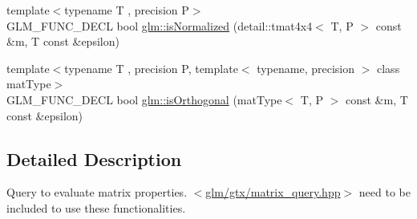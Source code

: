 \begin{DoxyCompactItemize}
\item 
{\footnotesize template$<$typename T , precision P$>$ }\\G\-L\-M\-\_\-\-F\-U\-N\-C\-\_\-\-D\-E\-C\-L bool \hyperlink{group__gtx__matrix__query_gad0ff11cc2c26d3086d9f88316a321637}{glm\-::is\-Normalized} (detail\-::tmat4x4$<$ T, P $>$ const \&m, T const \&epsilon)
\item 
{\footnotesize template$<$typename T , precision P, template$<$ typename, precision $>$ class mat\-Type$>$ }\\G\-L\-M\-\_\-\-F\-U\-N\-C\-\_\-\-D\-E\-C\-L bool \hyperlink{group__gtx__matrix__query_gab2cb5d23df77b4e4e63ad2965acd31b3}{glm\-::is\-Orthogonal} (mat\-Type$<$ T, P $>$ const \&m, T const \&epsilon)
\end{DoxyCompactItemize}


\subsection{Detailed Description}
Query to evaluate matrix properties. $<$\hyperlink{matrix__query_8hpp}{glm/gtx/matrix\-\_\-query.\-hpp}$>$ need to be included to use these functionalities. 

